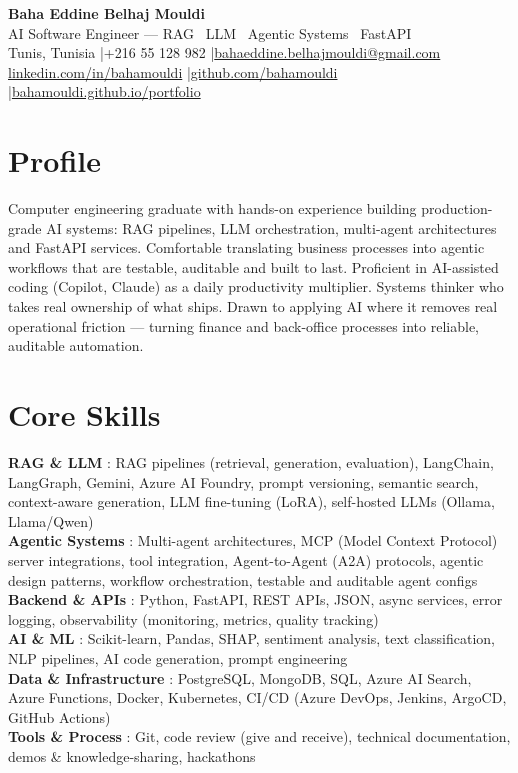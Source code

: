 \documentclass[a4paper,8.5pt]{article}
\begin{document}
\begin{center}
{\LARGE\bfseries\color{navy} Baha Eddine Belhaj Mouldi}\\[2pt]
{\normalsize\color{navy} AI Software Engineer --- RAG \textbar\ LLM \textbar\ Agentic Systems \textbar\ FastAPI}\\[3pt]
{\small Tunis, Tunisia \quad|\quad +216 55 128 982 \quad|\quad \href{mailto:bahaeddine.belhajmouldi@gmail.com}{bahaeddine.belhajmouldi@gmail.com}}\\[1pt]
{\small \href{https://www.linkedin.com/in/bahamouldi}{linkedin.com/in/bahamouldi} \quad|\quad \href{https://github.com/bahamouldi}{github.com/bahamouldi} \quad|\quad \href{https://bahamouldi.github.io/portfolio/}{bahamouldi.github.io/portfolio}}
\end{center}
\vspace{1pt}
\section{Profile}
Computer engineering graduate with hands-on experience building production-grade AI systems: RAG pipelines, LLM orchestration, multi-agent architectures and FastAPI services. Comfortable translating business processes into agentic workflows that are testable, auditable and built to last. Proficient in AI-assisted coding (Copilot, Claude) as a daily productivity multiplier. Systems thinker who takes real ownership of what ships. Drawn to applying AI where it removes real operational friction --- turning finance and back-office processes into reliable, auditable automation.
\section{Core Skills}
\textbf{RAG \& LLM} : RAG pipelines (retrieval, generation, evaluation), LangChain, LangGraph, Gemini, Azure AI Foundry, prompt versioning, semantic search, context-aware generation, LLM fine-tuning (LoRA), self-hosted LLMs (Ollama, Llama/Qwen)\\[0.3pt]
\textbf{Agentic Systems} : Multi-agent architectures, MCP (Model Context Protocol) server integrations, tool integration, Agent-to-Agent (A2A) protocols, agentic design patterns, workflow orchestration, testable and auditable agent configs\\[0.3pt]
\textbf{Backend \& APIs} : Python, FastAPI, REST APIs, JSON, async services, error logging, observability (monitoring, metrics, quality tracking)\\[0.3pt]
\textbf{AI \& ML} : Scikit-learn, Pandas, SHAP, sentiment analysis, text classification, NLP pipelines, AI code generation, prompt engineering\\[0.3pt]
\textbf{Data \& Infrastructure} : PostgreSQL, MongoDB, SQL, Azure AI Search, Azure Functions, Docker, Kubernetes, CI/CD (Azure DevOps, Jenkins, ArgoCD, GitHub Actions)\\[0.3pt]
\textbf{Tools \& Process} : Git, code review (give and receive), technical documentation, demos \& knowledge-sharing, hackathons
\end{document}
